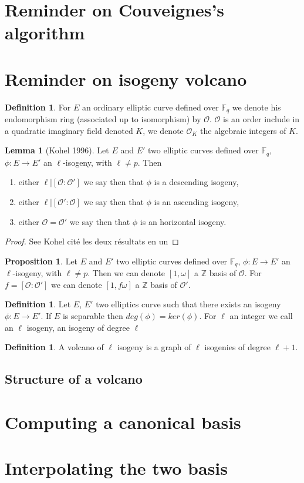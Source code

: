 \documentclass[10pt,a4paper]{article}
\author{Luca DeFeo,Cyril Hugounenq,Jérôme Plût, Eric Schost}
\theoremstyle{plain}
\theoremstyle{definition}
\newtheorem{lem}[thm]{Lemma}
\theoremstyle{definition}
\theoremstyle{definition}
\newtheorem{prop}[thm]{Proposition}
\theoremstyle{definition}
\newtheorem{defi}[thm]{Definition}
\theoremstyle{remark}
\theoremstyle{remark}
\begin{document}
\section{Reminder on Couveignes's algorithm}


\section{Reminder on isogeny volcano}
\begin{defi}
For $E$ an ordinary elliptic curve defined over $\mathbb{F}_q$ we denote  his endomorphism ring (associated up to isomorphism) by $\mathcal{O}$. $\mathcal{O}$ is an order include in a quadratic imaginary field denoted $K$, we denote $\mathcal{O}_K$ the algebraic integers of $K$.
\end{defi}

\begin{lem}[Kohel 1996]
Let $E$ and $E'$ two elliptic curves defined over $\mathbb{F}_q$, $\phi :E \rightarrow E'$ an $\ell$-isogeny, with $\ell \neq p$. Then
\begin{enumerate}
\item either $\ell|[\mathcal{O} : \mathcal{O}']$ we say then that $\phi$ is a descending isogeny,
\item either $\ell|[\mathcal{O}':\mathcal{O}]$ we say then that $\phi$ is an ascending isogeny,
\item either $\mathcal{O}=\mathcal{O}'$ we say then that $\phi$ is an horizontal isogeny.
\end{enumerate}
\end{lem}

\begin{proof}
See Kohel cité les deux résultats en un
\end{proof}

\begin{prop}
Let $E$ and $E'$ two elliptic curves defined over $\mathbb{F}_q$, $\phi :E \rightarrow E'$ an $\ell$-isogeny, with $\ell \neq p$. Then we can denote $[1,\omega]$ a $\mathbb{Z}$ basis of $\mathcal{O}$. For $f=[\mathcal{O} : \mathcal{O}']$ we can denote $[1,f\omega]$ a $\mathbb{Z}$ basis of $\mathcal{O'}$.
\end{prop}

\begin{defi}
Let $E$, $E'$ two elliptics curve such that there exists an isogeny $\phi: E \rightarrow E'$. If $E$ is separable then $deg(\phi)=ker(\phi)$. For $\ell$ an integer we call an $\ell$ isogeny, an isogeny of degree $\ell$
\end{defi}

\begin{defi}
A volcano of $\ell$ isogeny is a graph of $\ell$ isogenies of degree $\ell+1$.
\end{defi}
\subsection{Structure of a volcano}


\section{Computing a canonical basis}

\section{Interpolating the two basis}
\end{document}
